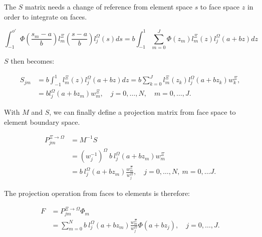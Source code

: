 \noindent
The \(S\) matrix needs a change of reference from element space \(s\) to face space \(z\) in order
to integrate on faces.

\begin{equation}
    \int_{-1}^{o'} \Phi(\frac{s_m -a}{b})l_m^\Xi(\frac{s -a}{b}) l_j^\Omega(s)ds
    = b\int_{-1}^{1}\sum_{m = 0}^{J} \Phi(z_m)l_m^{\Xi}(z)l_j^{\Omega}(a + bz)dz
\end{equation}

\noindent
\(S\) then becomes:

\begin{equation}
    \begin{aligned}
        S_{jm} & =  b\int_{-1}^{1}l_m^{\Xi}(z)l_j^{\Omega}(a + bz)dz
        = b\sum_{k = 0}^{J}l_m^{\Xi}(z_k)l_j^{\Omega}(a +b z_k)w_k^{\Xi},                             \\
               & = b l_j^{\Omega}(a + bz_m)w_m^{\Xi}, \quad j = 0, \ldots, N, \quad m = 0, \ldots, J.
    \end{aligned}
\end{equation}

\noindent
With \(M\) and \(S\), we can finally define a projection matrix from face space to element boundary
space.

\begin{equation}
    \begin{aligned}
        P^{\Xi \rightarrow \Omega}_{jm} & = M^{-1}S                                                                                                \\
                                        & = {(w_j^{-1})}^{\Omega } \: b \: l_j^{\Omega }(a + bz_m)w_m^{\Xi}                                        \\
                                        & = b \: l_j^{\Omega}(a + bz_m)\frac{w_m^{\Xi}}{w_j^{\Omega}}, \quad j = 0, \ldots, N, \: m = 0, \ldots J.
    \end{aligned}
\end{equation}

\noindent
The projection operation from faces to elements is therefore:

\begin{align} \label{projection_face_to_element}
    F & = P^{\Xi \rightarrow \Omega}_{jm} \Phi_m                                                                               \\
      & = \sum_{m = 0}^{N} b \: l_j^{\Omega}(a + bz_m)\frac{w_m^{\Xi}}{w_j^{\Omega}} \Phi (a + b z_j), \quad j = 0, \ldots, J.
\end{align}

